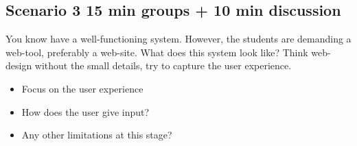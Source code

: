 \subsection*{Scenario 3 15 min groups + 10 min discussion}
You know have a well-functioning system. However, the students are demanding a web-tool, preferably a web-site. What does this system look like? Think web-design without the small details, try to capture the user experience.

\begin{itemize}
\item Focus on the user experience
\item How does the user give input?
\item Any other limitations at this stage?
\end{itemize}
